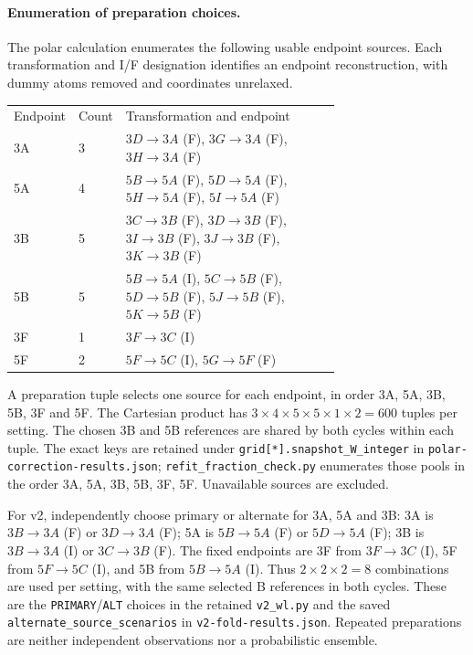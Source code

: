 \documentclass{article}
\begin{document}
\paragraph{Enumeration of preparation choices.}
The polar calculation enumerates the following usable endpoint sources. Each transformation and I/F designation identifies an endpoint reconstruction, with dummy atoms removed and coordinates unrelaxed.
\begin{center}\begin{tabular}{llp{0.71\linewidth}}
Endpoint & Count & Transformation and endpoint \\
3A & 3 & \(3D\to3A\) (F), \(3G\to3A\) (F), \(3H\to3A\) (F) \\
5A & 4 & \(5B\to5A\) (F), \(5D\to5A\) (F), \(5H\to5A\) (F), \(5I\to5A\) (F) \\
3B & 5 & \(3C\to3B\) (F), \(3D\to3B\) (F), \(3I\to3B\) (F), \(3J\to3B\) (F), \(3K\to3B\) (F) \\
5B & 5 & \(5B\to5A\) (I), \(5C\to5B\) (F), \(5D\to5B\) (F), \(5J\to5B\) (F), \(5K\to5B\) (F) \\
3F & 1 & \(3F\to3C\) (I) \\
5F & 2 & \(5F\to5C\) (I), \(5G\to5F\) (F) \\
\end{tabular}\end{center}
A preparation tuple selects one source for each endpoint, in order 3A, 5A, 3B, 5B, 3F and 5F. The Cartesian product has \(3\times4\times5\times5\times1\times2=600\) tuples per setting. The chosen 3B and 5B references are shared by both cycles within each tuple. The exact keys are retained under \texttt{grid[*].snapshot\_W\_integer} in \texttt{polar-correction-results.json}; \texttt{refit\_fraction\_check.py} enumerates those pools in the order 3A, 5A, 3B, 5B, 3F, 5F. Unavailable sources are excluded.

For v2, independently choose primary or alternate for 3A, 5A and 3B: 3A is \(3B\to3A\) (F) or \(3D\to3A\) (F); 5A is \(5B\to5A\) (F) or \(5D\to5A\) (F); 3B is \(3B\to3A\) (I) or \(3C\to3B\) (F). The fixed endpoints are 3F from \(3F\to3C\) (I), 5F from \(5F\to5C\) (I), and 5B from \(5B\to5A\) (I). Thus \(2\times2\times2=8\) combinations are used per setting, with the same selected B references in both cycles. These are the \texttt{PRIMARY}/\texttt{ALT} choices in the retained \texttt{v2\_wl.py} and the saved \texttt{alternate\_source\_scenarios} in \texttt{v2-fold-results.json}. Repeated preparations are neither independent observations nor a probabilistic ensemble.
\end{document}
